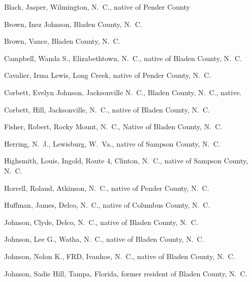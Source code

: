 \documentclass[11pt, a5paper]{book}
\begin{document}
\begin{thebibliography}{99}
  Black, Jasper, Wilmington, N.~C., native of Pender County

  Brown, Inez Johnson, Bladen County, N.~C.

  Brown, Vance, Bladen County, N.~C.

  Campbell, Wanda S., Elizabethtown, N.~C., native of Bladen County, N.~C.

  Cavalier, Irma Lewis, Long Creek, native of Pender County, N.~C.

  Corbett, Evelyn Johnson, Jacksonville N.~C., Bladen County, N.~C., native.

  Corbett, Hill, Jacksonville, N.~C., native of Bladen County, N.~C.

  Fisher, Robert, Rocky Mount, N.~C., Native of Bladen County, N.~C.

  Herring, N.~J., Lewisburg, W.~Va., native of Sampson County, N.~C.

  Highsmith, Louis, Ingold, Route 4, Clinton, N.~C., native of Sampson
  County, N.~C.

  Horrell, Roland, Atkinson, N.~C., native of Pender County, N.~C.

  Huffman, James, Delco, N.~C., native of Columbus County, N.~C.

  Johnson, Clyde, Delco, N.~C., native of Bladen County, N.~C.

  Johnson, Lee G., Watha, N.~C., native of Bladen County, N.~C.

  Johnson, Nolon K., FRD, Ivanhoe, N.~C., native of Bladen County, N.~C.

  Johnson, Sadie Hill, Tampa, Florida, former resident of Bladen County, N.~C.


\end{thebibliography}
\end{document}
